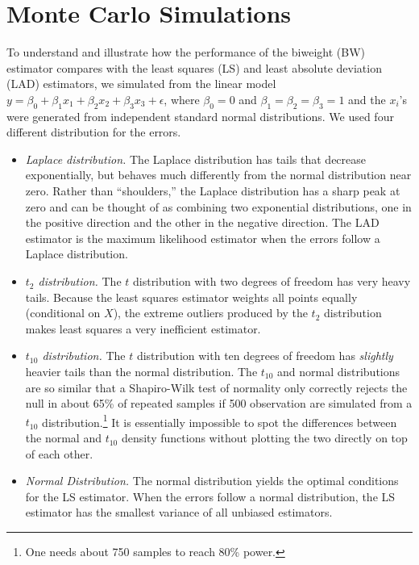 \documentclass[12pt]{article}
\begin{document}
\section*{Monte Carlo Simulations}

To understand and illustrate how the performance of the biweight (BW) estimator compares with the least squares (LS) and least absolute deviation (LAD) estimators, we simulated from the linear model $y = \beta_0 + \beta_1x_1 + \beta_2 x_2 + \beta_3 x_3 + \epsilon$, where $\beta_0 = 0$ and $\beta_1 = \beta_2 = \beta_3 = 1$ and the $x_i$'s were generated from independent standard normal distributions. 
We used four different distribution for the errors.
\begin{itemize}
\item \textit{Laplace distribution.} 
The Laplace distribution has tails that decrease exponentially, but behaves much differently from the normal distribution near zero. 
Rather than ``shoulders,'' the Laplace distribution has a sharp peak at zero and can be thought of as combining two exponential distributions, one in the positive direction and the other in the negative direction.
The LAD estimator is the maximum likelihood estimator when the errors follow a Laplace distribution.
\item \textit{$t_2$ distribution.} 
The $t$ distribution with two degrees of freedom has very heavy tails. 
Because the least squares estimator weights all points equally (conditional on $X$), the extreme outliers produced by the $t_2$ distribution makes least squares a very inefficient estimator.
\item \textit{$t_{10}$ distribution.} 
The $t$ distribution with ten degrees of freedom has \textit{slightly} heavier tails than the normal distribution. 
The $t_{10}$ and normal distributions are so similar that a Shapiro-Wilk test of normality only correctly rejects the null in about 65\% of repeated samples if 500 observation are simulated from a $t_{10}$ distribution.\footnote{One needs about 750 samples to reach 80\% power.} 
It is essentially impossible to spot the differences between the normal and $t_{10}$ density functions without plotting the two directly on top of each other.
\item \textit{Normal Distribution.} The normal distribution yields the optimal conditions for the LS estimator. 
When the errors follow a normal distribution, the LS estimator has the smallest variance of all unbiased estimators. 
\end{itemize}
\end{document}
